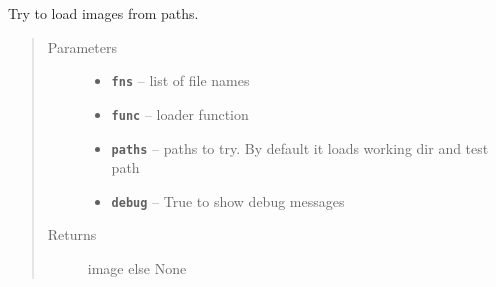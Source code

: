\documentclass[letterpaper,10pt,english]{sphinxmanual}
\begin{document}

\begin{fulllineitems}
\label{RRtoolbox.lib:RRtoolbox.lib.image.str2np}
\end{fulllineitems}


\begin{fulllineitems}
\label{RRtoolbox.lib:RRtoolbox.lib.image.transposeIm}
\end{fulllineitems}


\begin{fulllineitems}
\label{RRtoolbox.lib:RRtoolbox.lib.image.try_loads}
Try to load images from paths.
\begin{quote}\begin{description}
\item[{Parameters}] \leavevmode\begin{itemize}
\item {} 
\textbf{\texttt{fns}} -- list of file names

\item {} 
\textbf{\texttt{func}} -- loader function

\item {} 
\textbf{\texttt{paths}} -- paths to try. By default it loads working dir and test path

\item {} 
\textbf{\texttt{debug}} -- True to show debug messages

\end{itemize}

\item[{Returns}] \leavevmode
image else None

\end{description}\end{quote}

\end{fulllineitems}
\end{document}
